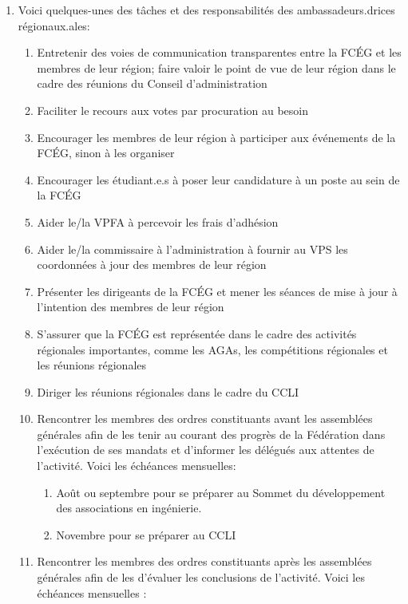 \begin{enumerate}
 \item
  Voici quelques-unes des tâches et des responsabilités des ambassadeurs.drices régionaux.ales:

  \begin{enumerate}
   \item
    Entretenir des voies de communication transparentes entre la FCÉG et les membres de leur région; faire valoir le point de vue de leur région dans le cadre des réunions du Conseil d'administration
   \item
    Faciliter le recours aux votes par procuration au besoin
   \item
    Encourager les membres de leur région à participer aux événements de la FCÉG, sinon à les organiser
   \item
    Encourager les étudiant.e.s à poser leur candidature à un poste au sein de la FCÉG
   \item
    Aider le/la VPFA à percevoir les frais d'adhésion
   \item
    Aider le/la commissaire à l'administration à fournir au VPS les coordonnées à jour des membres de leur région
   \item
    Présenter les dirigeants de la FCÉG et mener les séances de mise à jour à l'intention des membres de leur région
   \item
    S'assurer que la FCÉG est représentée dans le cadre des activités régionales importantes, comme les AGAs, les compétitions régionales et les réunions régionales
   \item
    Diriger les réunions régionales dans le cadre du CCLI
   \item
    Rencontrer les membres des ordres constituants avant les assemblées générales afin de les tenir au courant des progrès de la Fédération dans l'exécution de ses mandats et d'informer les délégués aux attentes de l'activité. Voici les échéances mensuelles:

    \begin{enumerate}
     \item
      Août ou septembre pour se préparer au Sommet du développement des associations en ingénierie.
     \item
      Novembre pour se préparer au CCLI
    \end{enumerate}
   \item
    Rencontrer les membres des ordres constituants après les assemblées générales afin de les d'évaluer les conclusions de l'activité. Voici les échéances mensuelles :


\end{enumerate}
\end{enumerate}
